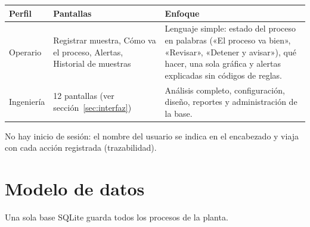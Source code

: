 \documentclass[11pt,a4paper]{article}
\begin{document}
\begin{tabularx}{\linewidth}{@{}P{2.2cm}P{4.6cm}L@{}}
\toprule
\textbf{Perfil} & \textbf{Pantallas} & \textbf{Enfoque}\\
\midrule
Operario & Registrar muestra, Cómo va el proceso, Alertas, Historial de muestras &
  Lenguaje simple: estado del proceso en palabras («El proceso va bien», «Revisar», «Detener y
  avisar»), qué hacer, una sola gráfica y alertas explicadas sin códigos de reglas.\\
Ingeniería & 12 pantallas (ver sección~\ref{sec:interfaz}) &
  Análisis completo, configuración, diseño, reportes y administración de la base.\\
\bottomrule
\end{tabularx}

No hay inicio de sesión: el nombre del usuario se indica en el encabezado y viaja con cada
acción registrada (trazabilidad).

\section{Modelo de datos}

Una sola base SQLite guarda todos los procesos de la planta.
\end{document}
